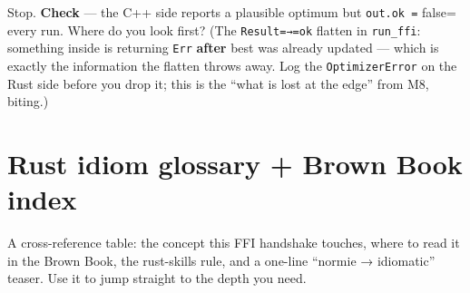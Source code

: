 \documentclass[11pt]{article}
\begin{document}
Stop. \textbf{\textbf{Check}} — the C++ side reports a plausible optimum but \texttt{out.ok =} false=
every run. Where do you look first? (The \texttt{Result=→=ok} flatten in \texttt{run\_ffi}:
something inside is returning \texttt{Err} \textbf{after} best was already updated — which is
exactly the information the flatten throws away. Log the \texttt{OptimizerError}
on the Rust side before you drop it; this is the ``what is lost at the edge''
from M8, biting.)
\section{Rust idiom glossary + Brown Book index}
\label{sec:org5a07f52}

A cross-reference table: the concept this FFI handshake touches, where to read
it in the Brown Book, the rust-skills rule, and a one-line ``normie → idiomatic''
teaser. Use it to jump straight to the depth you need.
\end{document}
